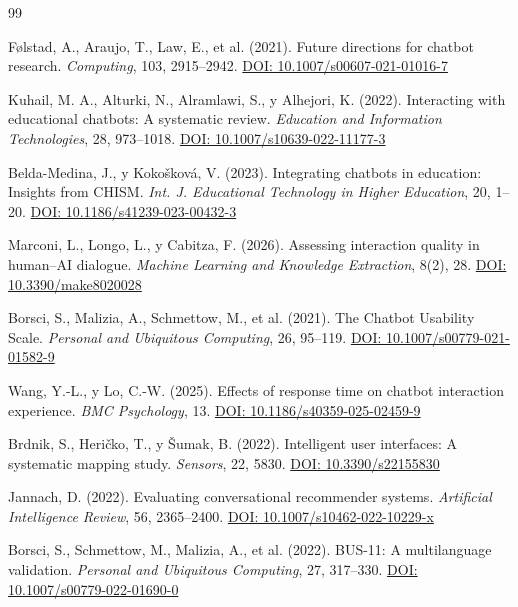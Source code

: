 \documentclass[11pt,twocolumn]{article}
\begin{document}
\begin{thebibliography}{99}
\footnotesize

Følstad, A., Araujo, T., Law, E., et al. (2021). Future directions for chatbot research. \textit{Computing}, 103, 2915--2942. \href{https://doi.org/10.1007/s00607-021-01016-7}{DOI: 10.1007/s00607-021-01016-7}

Kuhail, M. A., Alturki, N., Alramlawi, S., y Alhejori, K. (2022). Interacting with educational chatbots: A systematic review. \textit{Education and Information Technologies}, 28, 973--1018. \href{https://doi.org/10.1007/s10639-022-11177-3}{DOI: 10.1007/s10639-022-11177-3}

Belda-Medina, J., y Kokošková, V. (2023). Integrating chatbots in education: Insights from CHISM. \textit{Int. J. Educational Technology in Higher Education}, 20, 1--20. \href{https://doi.org/10.1186/s41239-023-00432-3}{DOI: 10.1186/s41239-023-00432-3}

Marconi, L., Longo, L., y Cabitza, F. (2026). Assessing interaction quality in human--AI dialogue. \textit{Machine Learning and Knowledge Extraction}, 8(2), 28. \href{https://doi.org/10.3390/make8020028}{DOI: 10.3390/make8020028}

Borsci, S., Malizia, A., Schmettow, M., et al. (2021). The Chatbot Usability Scale. \textit{Personal and Ubiquitous Computing}, 26, 95--119. \href{https://doi.org/10.1007/s00779-021-01582-9}{DOI: 10.1007/s00779-021-01582-9}

Wang, Y.-L., y Lo, C.-W. (2025). Effects of response time on chatbot interaction experience. \textit{BMC Psychology}, 13. \href{https://doi.org/10.1186/s40359-025-02459-9}{DOI: 10.1186/s40359-025-02459-9}

Brdnik, S., Heričko, T., y Šumak, B. (2022). Intelligent user interfaces: A systematic mapping study. \textit{Sensors}, 22, 5830. \href{https://doi.org/10.3390/s22155830}{DOI: 10.3390/s22155830}

Jannach, D. (2022). Evaluating conversational recommender systems. \textit{Artificial Intelligence Review}, 56, 2365--2400. \href{https://doi.org/10.1007/s10462-022-10229-x}{DOI: 10.1007/s10462-022-10229-x}

Borsci, S., Schmettow, M., Malizia, A., et al. (2022). BUS-11: A multilanguage validation. \textit{Personal and Ubiquitous Computing}, 27, 317--330. \href{https://doi.org/10.1007/s00779-022-01690-0}{DOI: 10.1007/s00779-022-01690-0}


\end{thebibliography}
\end{document}
